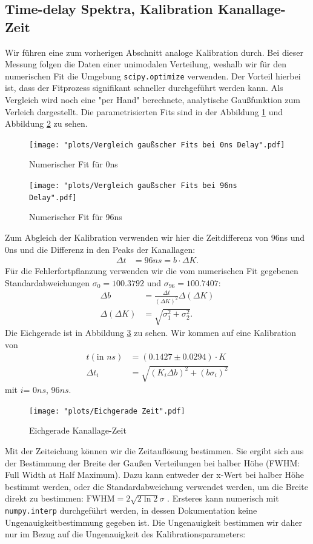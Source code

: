 \documentclass[%
aps,
onecolumn,
11pt,
tightenlines,
nofootinbib,
superscriptaddress,
floatfix,
prd,
]{revtex4-2}
\begin{document}
\subsection{Time-delay Spektra, Kalibration Kanallage-Zeit}
Wir führen eine zum vorherigen Abschnitt analoge Kalibration durch. Bei dieser Messung folgen die Daten einer unimodalen Verteilung, weshalb wir für den numerischen Fit die Umgebung \texttt{scipy.optimize} verwenden. Der Vorteil hierbei ist, dass der Fitprozess signifikant schneller durchgeführt werden kann. Als Vergleich wird noch eine "per Hand" berechnete, analytische Gaußfunktion zum Verleich dargestellt. Die parametrisierten Fits sind in der Abbildung \ref{fig:timedelay} und Abbildung \ref{fig:timedelay96} zu sehen. 
\begin{figure}[H]
	\centering
	\texttt{[image: "plots/Vergleich gaußscher Fits bei 0ns Delay".pdf]}
	\caption{Numerischer Fit für 0ns}
	\label{fig:timedelay}
\end{figure}
\begin{figure}[H]
	\centering
	\texttt{[image: "plots/Vergleich gaußscher Fits bei 96ns Delay".pdf]}
	\caption{Numerischer Fit für 96ns}
	\label{fig:timedelay96}
\end{figure}
Zum Abgleich der Kalibration verwenden wir hier die Zeitdifferenz von $96$ns und $0$ns und die Differenz in den Peaks der Kanallagen:
\begin{align}
	\Delta t &= 96ns = b \cdot \Delta K. 
\end{align}
Für die Fehlerfortpflanzung verwenden wir die vom numerischen Fit gegebenen Standardabweichungen $\sigma_{0}=100.3792$ und $\sigma_{96}= 100.7407$:
\begin{align}
    \Delta b &= \frac{\Delta t}{(\Delta K)^2} \Delta(\Delta K) \\
    \Delta (\Delta K) &= \sqrt{ \sigma_1^2 + \sigma_2^2 }.
\end{align}
Die Eichgerade ist in Abbildung \ref{fig:timecalibrate} zu sehen. Wir kommen auf eine Kalibration von
\begin{align}
	t (\text{in $ns$})&= (0.1427 \pm 0.0294) \cdot K \\
	\Delta t_{i} &= \sqrt{ (K_i \Delta b)^2 + (b \sigma_i)^2 }
\end{align}
mit $i $= 0$ns$, 96$ns$.
\begin{figure}[H]
	\centering
	\texttt{[image: "plots/Eichgerade Zeit".pdf]}
	\caption{Eichgerade Kanallage-Zeit}
	\label{fig:timecalibrate}
\end{figure}
Mit der Zeiteichung können wir die Zeitauflösung bestimmen. Sie ergibt sich aus der Bestimmung der Breite der Gaußen Verteilungen bei halber Höhe (FWHM: Full Width at Half Maximum). Dazu kann entweder der x-Wert bei halber Höhe bestimmt werden, oder die Standardabweichung verwendet werden, um die Breite direkt zu bestimmen: $\text{FWHM} =2 \sqrt{2\ln 2}\sigma$ \cite{FWHM}. Ersteres kann numerisch mit \texttt{numpy.interp} durchgeführt werden, in dessen Dokumentation keine Ungenauigkeitbestimmung gegeben ist. Die Ungenauigkeit bestimmen wir daher nur im Bezug auf die Ungenauigkeit des Kalibrationsparameters:
\end{document}

